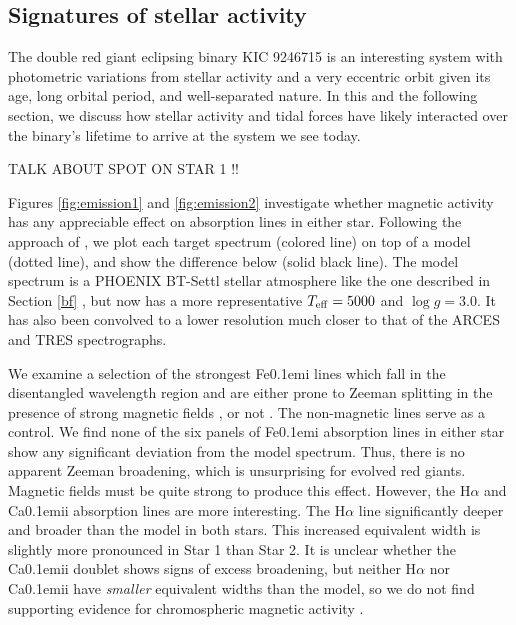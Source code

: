 \subsection{Signatures of stellar activity}\label{actrot}
The double red giant eclipsing binary KIC 9246715 is an interesting system with photometric variations from stellar activity and a very eccentric orbit given its age, long orbital period, and well-separated nature. In this and the following section, we discuss how stellar activity and tidal forces have likely interacted over the binary's lifetime to arrive at the system we see today.

TALK ABOUT SPOT ON STAR 1 !!

Figures \ref{fig:emission1} and \ref{fig:emission2} investigate whether magnetic activity has any appreciable effect on absorption lines in either star. Following the approach of \citet{fro12}, we plot each target spectrum (colored line) on top of a model (dotted line), and show the difference below (solid black line). The model spectrum is a PHOENIX BT-Settl stellar atmosphere like the one described in Section \ref{bf} \citep{all03,asp09}, but now has a more representative $T_{\rm{eff}} = 5000$ and $\log g = 3.0$. It has also been convolved to a lower resolution much closer to that of the ARCES and TRES spectrographs.

We examine a selection of the strongest {\rm Fe}\kern 0.1em{\sc i} lines which fall in the disentangled wavelength region and are either prone to Zeeman splitting in the presence of strong magnetic fields \citep{har73}, or not \citep{sis70}. The non-magnetic lines serve as a control. We find none of the six panels of {\rm Fe}\kern 0.1em{\sc i} absorption lines in either star show any significant deviation from the model spectrum. Thus, there is no apparent Zeeman broadening, which is unsurprising for evolved red giants. Magnetic fields must be quite strong to produce this effect. However, the H$\alpha$ and {\rm Ca}\kern 0.1em{\sc ii} absorption lines are more interesting. The H$\alpha$ line significantly deeper and broader than the model in both stars. This increased equivalent width is slightly more pronounced in Star 1 than Star 2. It is unclear whether the {\rm Ca}\kern 0.1em{\sc ii} doublet shows signs of excess broadening, but neither H$\alpha$ nor {\rm Ca}\kern 0.1em{\sc ii} have \emph{smaller} equivalent widths than the model, so we do not find supporting evidence for chromospheric magnetic activity \citep{fro12}.

  
  
  
